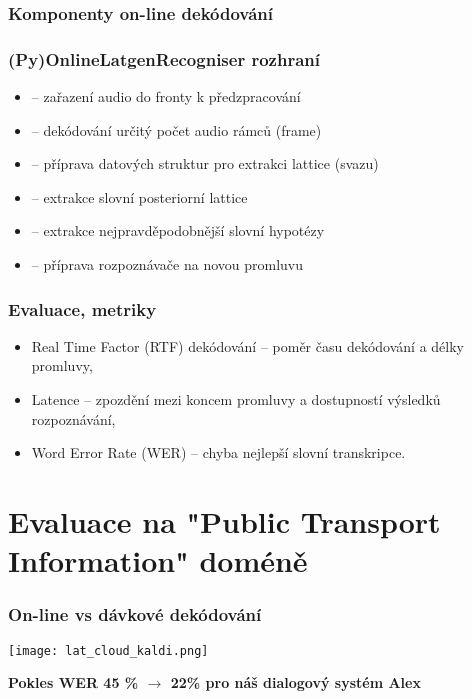 \begin{frame}\frametitle{Komponenty on-line dekódování} 
    \begin{center}
        
    \end{center}
\end{frame}

\begin{frame}\frametitle{(Py)OnlineLatgenRecogniser rozhraní} 
    \begin{itemize}
        \item {} -- zařazení audio do fronty k předzpracování
        \item {} -- dekódování určitý počet audio rámců (frame)
        \item {} -- příprava datových struktur pro extrakci lattice (svazu)
        \item {} -- extrakce slovní posteriorní lattice
        \item {} -- extrakce nejpravděpodobnější slovní hypotézy
        \item {} -- příprava rozpoznávače na novou promluvu
    \end{itemize}
\end{frame}


\begin{frame}\frametitle{Evaluace, metriky} 
    \begin{itemize}
        \item Real Time Factor (RTF) dekódování -- poměr času dekódování a délky promluvy,
        \item Latence -- zpozdění mezi koncem promluvy a dostupností výsledků rozpoznávání,
        \item Word Error Rate (WER) -- chyba nejlepší slovní transkripce.
    \end{itemize}
\end{frame}

\section[Evaluace na "PTI"]{Evaluace na "Public Transport Information" doméně}%

\begin{frame}\frametitle{On-line vs dávkové dekódování} 
    \begin{center}
        \texttt{[image: lat\_cloud\_kaldi.png]}
    \end{center}
    \bf {Pokles WER 45 \% $\longrightarrow$ 22\%} pro náš dialogový systém Alex
\end{frame}

